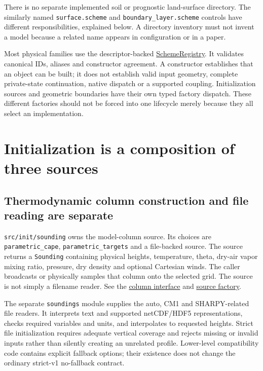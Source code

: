 There is no separate implemented soil or prognostic land-surface directory.
The similarly named \texttt{surface.scheme} and
\texttt{boundary\_layer.scheme} controls have different responsibilities,
explained below. A directory inventory must not invent a model because a
related name appears in configuration or in a paper.

Most physical families use the descriptor-backed
\href{../include/util/scheme_factory.hpp}{SchemeRegistry}. It validates
canonical IDs, aliases and constructor agreement. A constructor establishes
that an object can be built; it does not establish valid input geometry,
complete private-state continuation, native dispatch or a supported coupling.
Initialization sources and geometric boundaries have their own typed factory
dispatch. These different factories should not be forced into one lifecycle
merely because they all select an implementation.

\section{Initialization is a composition of three sources}
\label{architecture-initialization}

\subsection{Thermodynamic column construction and file reading are separate}

\texttt{src/init/sounding} owns the model-column source. Its choices are
\texttt{parametric\_cape}, \texttt{parametric\_targets} and a file-backed
source. The source returns a \texttt{Sounding} containing physical heights,
temperature, theta, dry-air vapor mixing ratio, pressure, dry density and
optional Cartesian winds. The caller broadcasts or physically samples that
column onto the selected grid. The source is not simply a filename reader.
See the \href{../include/init/sounding/sounding_source.hpp}{column interface}
and \href{../src/init/sounding/factory.cpp}{source factory}.

The separate \texttt{soundings} module supplies the auto, CM1 and SHARPY-related
file readers. It interprets text and supported netCDF/HDF5 representations,
checks required variables and units, and interpolates to requested heights.
Strict file initialization requires adequate vertical coverage and rejects
missing or invalid inputs rather than silently creating an unrelated profile.
Lower-level compatibility code contains explicit fallback options; their
existence does not change the ordinary strict-v1 no-fallback contract.

